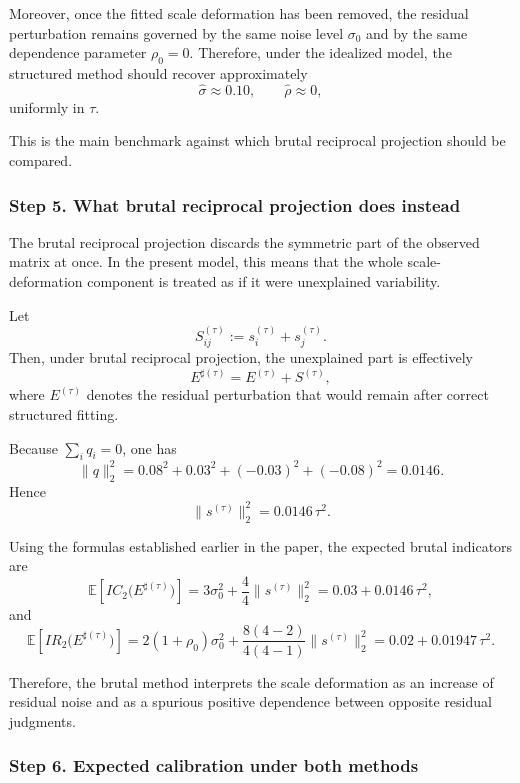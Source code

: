 \documentclass[11pt]{amsart}
\theoremstyle{definition}
\theoremstyle{plain}
\numberwithin{equation}{section}
\begin{document}
Moreover, once the fitted scale deformation has been removed, the residual perturbation remains governed by the same noise level $\sigma_0$ and by the same dependence parameter $\rho_0=0$. Therefore, under the idealized model, the structured method should recover approximately
\[
\widehat\sigma\approx 0.10,
\qquad
\widehat\rho\approx 0,
\]
uniformly in $\tau$.

This is the main benchmark against which brutal reciprocal projection should be compared.

\subsubsection*{Step 5. What brutal reciprocal projection does instead}

The brutal reciprocal projection discards the symmetric part of the observed matrix at once. In the present model, this means that the whole scale-deformation component is treated as if it were unexplained variability.

Let
\[
S^{(\tau)}_{ij}:=s^{(\tau)}_i+s^{(\tau)}_j.
\]
Then, under brutal reciprocal projection, the unexplained part is effectively
\[
E^{\sharp(\tau)}=E^{(\tau)}+S^{(\tau)},
\]
where $E^{(\tau)}$ denotes the residual perturbation that would remain after correct structured fitting.

Because $\sum_i q_i=0$, one has
\[
\|q\|_2^2
=
0.08^2+0.03^2+(-0.03)^2+(-0.08)^2
=
0.0146.
\]
Hence
\[
\|s^{(\tau)}\|_2^2=0.0146\,\tau^2.
\]

Using the formulas established earlier in the paper, the expected brutal indicators are
\begin{equation}\label{eq:IC2brutal_tau}
\mathbb E\!\left[IC_2\bigl(E^{\sharp(\tau)}\bigr)\right]
=
3\sigma_0^2+\frac{4}{4}\|s^{(\tau)}\|_2^2
=
0.03+0.0146\,\tau^2,
\end{equation}
and
\begin{equation}\label{eq:IR2brutal_tau}
\mathbb E\!\left[IR_2\bigl(E^{\sharp(\tau)}\bigr)\right]
=
2(1+\rho_0)\sigma_0^2+\frac{8(4-2)}{4(4-1)}\|s^{(\tau)}\|_2^2
=
0.02+0.01947\,\tau^2.
\end{equation}

Therefore, the brutal method interprets the scale deformation as an increase of residual noise and as a spurious positive dependence between opposite residual judgments.

\subsubsection*{Step 6. Expected calibration under both methods}
\end{document}

